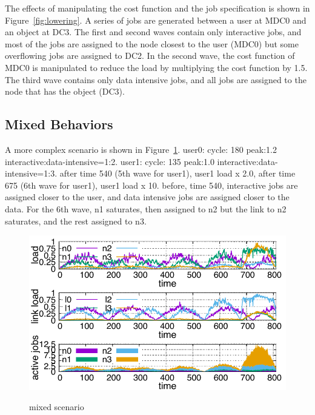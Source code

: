 The effects of manipulating the cost function and the job
specification is shown in Figure~\ref{fig:lowering}.
A series of jobs are generated between a user at MDC0 and an object at DC3.
The first and second waves contain only interactive jobs, and most of
the jobs are assigned to the node closest to the user (MDC0) but some
overflowing jobs are assigned to DC2.
In the second wave, the cost function of MDC0 is manipulated to reduce
the load by multiplying the cost function by 1.5.
The third wave contains only data intensive jobs, and all jobs are
assigned to the node that has the object (DC3).

\subsection{Mixed Behaviors}

A more complex scenario is shown in Figure~\ref{fig:mixed}.
user0: cycle: 180  peak:1.2 interactive:data-intensive=1:2.
user1: cycle: 135  peak:1.0  interactive:data-intensive=1:3.
after time 540 (5th wave for user1), user1 load x 2.0, 
after time 675 (6th wave for user1), user1 load x 10.
before, time 540, interactive jobs are assigned closer to the user,
and data intensive jobs are assigned closer to the data.
For the 6th wave, n1 saturates, then assigned to n2 but the link to n2
saturates, and the rest assigned to n3.

\begin{figure}[tb]
  \begin{center}
    \includegraphics[width=1.0\columnwidth]{simu2.pdf}
    \vspace{-2.0ex}
    \caption{mixed scenario}
    \label{fig:mixed}
  \end{center}
\end{figure}

